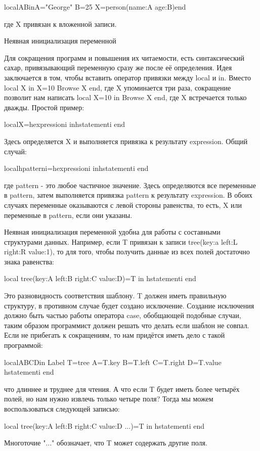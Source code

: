 localABinA="George" B=25 X=person(name:A age:B)end

где X привязан к вложенной записи.

Неявная инициализация переменной

Для сокращения программ и повышения их читаемости, есть синтаксический сахар, привязывающий переменную сразу же после её определения. Идея заключается в том, чтобы вставить оператор привязки между local и in. Вместо local X in X=10 {Browse X} end, где X упоминается три раза, сокращение позволит нам написать local X=10 in {Browse X} end, где X встречается только дважды. Простой пример:

localX=hexpressioni inhstatementi end

Здесь определяется X и выполняется привязка к результату expression. Общий случай:

localhpatterni=hexpressioni inhstatementi end

где pattern - это любое частичное значение. Здесь определяются все переменные в pattern, затем выполняется привязка pattern к результату expression. В обоих случаях переменные оказываются с левой стороны равенства, то есть, X или переменные в pattern, если они указаны.

Неявная инициализация переменной удобна для работы с составными структурами данных. Например, если T привязан к записи  tree(key:a left:L right:R value:1), то для того, чтобы получить данные из всех полей достаточно знака равенства:

local
tree(key:A left:B right:C value:D)=T
in
hstatementi
end

Это разновидность соответствия шаблону. T должен иметь правильную структуру, в противном случае будет создано исключение. Создание исключения должно быть частью работы оператора case, обобщающей подобные случаи, таким образом программист должен решать что делать если шаблон не совпал. Если не прибегать к сокращениям, то нам придётся иметь дело с такой программой:

localABCDin
{Label T}=tree
A=T.key
B=T.left
C=T.right
D=T.value
hstatementi
end

что длиннее и труднее для чтения. А что если T будет иметь более четырёх полей, но нам нужно извлечь только четыре поля? Тогда мы можем воспользоваться следующей записью:

local
tree(key:A left:B right:C value:D ...)=T
in
hstatementi
end

Многоточие "..." обозначает, что T может содержать другие поля.

